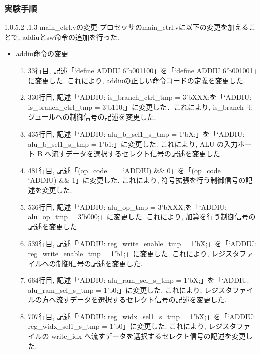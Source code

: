 \documentclass[epsf,a4paper,dvipdfmx,autodetect-engine,titlepage]{jsarticle}
\makeatletter
\newcommand{\subsubsubsection}
{\@startsection{paragraph}{4}{\z@}%
{1.0\Cvs \@plus.5\Cdp \@minus.2\Cdp}%
{.1\Cvs \@plus.3\Cdp}%
{\reset@font\sffamily\normalsize}}
\makeatother
\begin{document}
\subsubsection{実験手順}
\subsubsubsection{main\_ctrl.vの変更}
プロセッサのmain\_ctrl.vに以下の変更を加えることで, addiuとsw命令の追加を行った.
\begin{itemize}
    \item addiu命令の変更
\begin{enumerate}
    \item 33行目, 記述「`define  ADDIU  6'b001100」を「`define  ADDIU  6'b001001」に変更した. これにより, addiuの正しい命令コードの定義を変更した.
    
    \item 330行目, 記述「`ADDIU:  is\_branch\_ctrl\_tmp = 3'bXXX;を「`ADDIU:  is\_branch\_ctrl\_tmp = 3'b110;」に変更した．これにより, is\_branch モジュールへの制御信号の記述を変更した.
    
    \item 435行目, 記述「`ADDIU:  alu\_b\_sel1\_s\_tmp = 1'bX;」を「`ADDIU:  alu\_b\_sel1\_s\_tmp = 1'b1;」に変更した. これにより, ALU の入力ポート B へ流すデータを選択するセレクト信号の記述を変更した.
    
    \item 481行目, 記述「(op\_code == `ADDIU) \&\& 0」を「(op\_code == `ADDIU) \&\& 1」に変更した. これにより, 符号拡張を行う制御信号の記述を変更した.
    
    \item 536行目, 記述「`ADDIU:  alu\_op\_tmp = 3'bXXX;を「`ADDIU:  alu\_op\_tmp = 3'b000;」に変更した. これにより, 加算を行う制御信号の記述を変更した. 
    
    \item 539行目, 記述「`ADDIU:  reg\_write\_enable\_tmp = 1'bX;」を「`ADDIU:  reg\_write\_enable\_tmp = 1'b1;」に変更した. これにより, レジスタファイルへの制御信号の記述を変更した.
    
    \item 664行目, 記述「`ADDIU:  alu\_ram\_sel\_s\_tmp = 1'bX;」を「`ADDIU:  alu\_ram\_sel\_s\_tmp = 1'b0;」に変更した. これにより, レジスタファイルの方へ流すデータを選択するセレクト信号の記述を変更した.
    
    \item 707行目, 記述「`ADDIU:  reg\_widx\_sel1\_s\_tmp = 1'bX;」を「`ADDIU:  reg\_widx\_sel1\_s\_tmp = 1'b0」に変更した. これにより, レジスタファイルの write\_idx へ流すデータを選択するセレクト信号の記述を変更した.
    

\end{enumerate}
\end{itemize}
\end{document}
